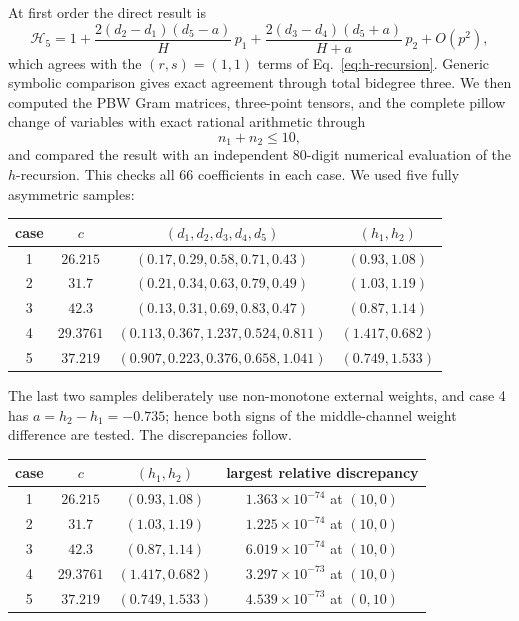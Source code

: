 \documentclass[11pt]{article}
\newcommand{\cH}{\mathcal H}
\begin{document}
At first order the direct result is
\begin{equation}
 \cH_5
 =1+
 \frac{2(d_2-d_1)(d_5-a)}{H}\,p_1
 +\frac{2(d_3-d_4)(d_5+a)}{H+a}\,p_2
 +O(p^2),
 \label{eq:first-pbw-coefficients}
\end{equation}
which agrees with the $(r,s)=(1,1)$ terms of
Eq.~\eqref{eq:h-recursion}.  Generic symbolic comparison gives exact
agreement through total bidegree three.  We then computed the PBW Gram
matrices, three-point tensors, and the complete pillow change of variables
with exact rational arithmetic through
\begin{equation}
 n_1+n_2\leq10,
\end{equation}
and compared the result with an independent $80$-digit numerical evaluation
of the $h$-recursion.  This checks all $66$ coefficients in each case.  We
used five fully asymmetric samples:
\begin{center}
\scriptsize
\begin{tabular}{c|c|c|c}
case & $c$ & $(d_1,d_2,d_3,d_4,d_5)$ & $(h_1,h_2)$\\ \hline
1 & $26.215$  & $(0.17,0.29,0.58,0.71,0.43)$ & $(0.93,1.08)$\\
2 & $31.7$    & $(0.21,0.34,0.63,0.79,0.49)$ & $(1.03,1.19)$\\
3 & $42.3$    & $(0.13,0.31,0.69,0.83,0.47)$ & $(0.87,1.14)$\\
4 & $29.3761$ & $(0.113,0.367,1.237,0.524,0.811)$ & $(1.417,0.682)$\\
5 & $37.219$  & $(0.907,0.223,0.376,0.658,1.041)$ & $(0.749,1.533)$
\end{tabular}
\end{center}
The last two samples deliberately use non-monotone external weights, and
case 4 has $a=h_2-h_1=-0.735$; hence both signs of the middle-channel weight
difference are tested.  The discrepancies follow.
\begin{center}
\begin{tabular}{c|c|c|c}
case & $c$ & $(h_1,h_2)$ & largest relative discrepancy\\ \hline
1 & $26.215$ & $(0.93,1.08)$ & $1.363\times10^{-74}$ at $(10,0)$\\
2 & $31.7$   & $(1.03,1.19)$ & $1.225\times10^{-74}$ at $(10,0)$\\
3 & $42.3$   & $(0.87,1.14)$ & $6.019\times10^{-74}$ at $(10,0)$\\
4 & $29.3761$ & $(1.417,0.682)$ & $3.297\times10^{-73}$ at $(10,0)$\\
5 & $37.219$ & $(0.749,1.533)$ & $4.539\times10^{-73}$ at $(0,10)$
\end{tabular}
\end{center}
\end{document}

